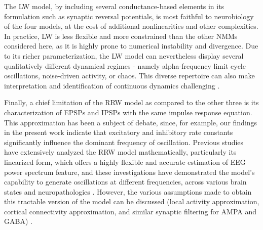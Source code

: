 \documentclass[12pt,twoside]{article}
\begin{document}
The LW model, by including several conductance-based elements in its formulation such as synaptic reversal potentials, is most faithful to neurobiology of the four models, at the cost of additional nonlinearities and other complexities. In practice, LW is less flexible and more constrained than the other NMMs considered here, as it is highly prone to numerical instability and divergence. Due to its richer parameterization, the LW model can nevertheless display several qualitatively different dynamical regimes - namely alpha-frequency limit cycle oscillations, noise-driven activity, or chaos. This diverse repertoire can also make interpretation and identification of continuous dynamics challenging \citep{liley2001spatially}. 

Finally, a chief limitation of the RRW model as compared to the other three is its characterization of EPSPs and IPSPs with the same impulse response equation. This approximation has been a subject of debate, since, for example, our findings in the present work indicate that excitatory and inhibitory rate constants significantly influence the dominant frequency of oscillation. Previous studies have extensively analyzed the RRW model mathematically, particularly its linearized form, which offers a highly flexible and accurate estimation of EEG power spectrum feature, and these investigations have demonstrated the model's capability to generate oscillations at different frequencies, across various brain states and neuropathologies \citep{roberts2008modeling, zhao2015generalized, muller2017unified}. However, the various assumptions made to obtain this tractable version of the model can be discussed (local activity approximation, cortical connectivity approximation, and similar synaptic filtering for AMPA and GABA) .
\end{document}
